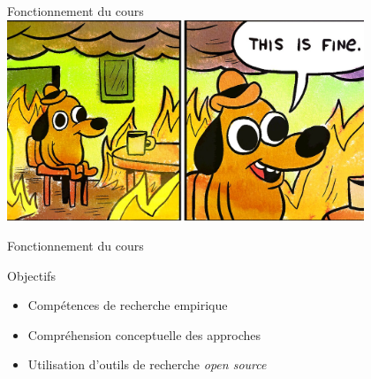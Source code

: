 \documentclass[10pt]{beamer}
\begin{document}
\begin{frame}{Fonctionnement du cours}
    \includegraphics[height=6cm]{fine.jpg}
\end{frame}

\begin{frame}{Fonctionnement du cours}

    \begin{block}{Objectifs}
        \begin{itemize}
            \item<2->[1.] Compétences de recherche empirique
            \item<3->[2.] Compréhension conceptuelle des approches
            \item<4->[3.] Utilisation d'outils de recherche \textit{open source}
        \end{itemize}
    \end{block}


\end{frame}
\end{document}
